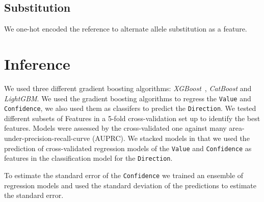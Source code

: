\documentclass{article}
\begin{document}
\subsection*{Substitution}

We one-hot encoded the reference to alternate allele substitution as a feature.


\section*{Inference}

We used three different gradient boosting algorithms:
\emph{XGBoost}~\cite{ChenXGBoostScalableTree2016}, \emph{CatBoost} and
\emph{LightGBM}. We used the gradient boosting algorithms to regress the
\texttt{Value} and \texttt{Confidence}, we also used them as classifers to
predict the \texttt{Direction}. We tested different subsets of Features in a
5-fold cross-validation set up to identify the best features.  Models were
assessed by the cross-validated one against many
area-under-precision-recall-curve (AUPRC). We stacked models in that we used
the prediction of cross-validated regression models of the \texttt{Value} and
\texttt{Confidence} as features in the classification model for the
\texttt{Direction}.

To estimate the standard error of the \texttt{Confidence} we trained an
ensemble of regression models and used the standard deviation of the
predictions to estimate the standard error.



%
%
\printbibliography
\end{document}
